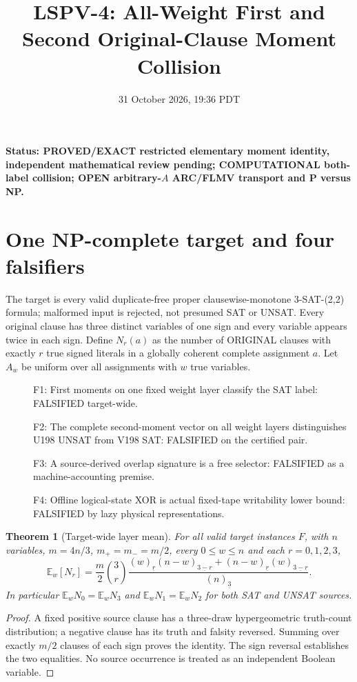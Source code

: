 \documentclass[11pt]{article}
\title{LSPV-4: All-Weight First and Second Original-Clause Moment Collision}
\date{31 October 2026, 19:36 PDT}
\newtheorem{theorem}{Theorem}
\begin{document}
\maketitle
\noindent\textbf{Status: PROVED/EXACT restricted elementary moment identity, independent mathematical review pending; COMPUTATIONAL both-label collision; OPEN arbitrary-$A$ ARC/FLMV transport and P versus NP.}
\section{One NP-complete target and four falsifiers}
The target is every valid duplicate-free proper clausewise-monotone 3-SAT-(2,2) formula; malformed input is rejected, not presumed SAT or UNSAT. Every original clause has three distinct variables of one sign and every variable appears twice in each sign. Define $N_r(a)$ as the number of ORIGINAL clauses with exactly $r$ true signed literals in a globally coherent complete assignment $a$. Let $A_w$ be uniform over all assignments with $w$ true variables.
\begin{description}
\item[] F1: First moments on one fixed weight layer classify the SAT label: FALSIFIED target-wide.
\item[] F2: The complete second-moment vector on all weight layers distinguishes U198 UNSAT from V198 SAT: FALSIFIED on the certified pair.
\item[] F3: A source-derived overlap signature is a free selector: FALSIFIED as a machine-accounting premise.
\item[] F4: Offline logical-state XOR is actual fixed-tape writability lower bound: FALSIFIED by lazy physical representations.
\end{description}
\begin{theorem}[Target-wide layer mean]
For all valid target instances $F$, with $n$ variables, $m=4n/3$, $m_+=m_-=m/2$, every $0\le w\le n$ and each $r=0,1,2,3$,
\[
\mathbb E_w[N_r]=\frac{m}{2}\binom3r
\frac{(w)_{\underline r}(n-w)_{\underline{3-r}}+
(n-w)_{\underline r}(w)_{\underline{3-r}}}{(n)_{\underline3}}.
\]
In particular $\mathbb E_wN_0=\mathbb E_wN_3$ and $\mathbb E_wN_1=\mathbb E_wN_2$ for both SAT and UNSAT sources. 
\end{theorem}
\begin{proof}
A fixed positive source clause has a three-draw hypergeometric truth-count distribution; a negative clause has its truth and falsity reversed. Summing over exactly $m/2$ clauses of each sign proves the identity. The sign reversal establishes the two equalities. No source occurrence is treated as an independent Boolean variable.
\end{proof}
\end{document}
